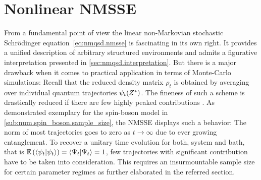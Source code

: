 \section{Nonlinear NMSSE}
\label{sec:nmqsd.nonlin_nmsse}
%

From a fundamental point of view the linear non-Markovian stochastic Schrödinger equation~\ref{eq:nmqsd.nmsse} is fascinating in its own right.
It provides a unified description of arbitrary structured environments and admits a figurative interpretation presented in \autoref{sec:nmqsd.interpretation}.
But there is a major drawback when it comes to practical application in terms of Monte-Carlo simulations:
Recall that the reduced density matrix $\rho_t$ is obtained by averaging over individual quantum trajectories $\psi_t({Z}^*)$.
The fineness of such a scheme is drastically reduced if there are few highly peaked contributions \cite{DuSh11_monte_carlo}.
As demonstrated exemplary for the spin-boson model in \autoref{sub:num.spin_boson.sample_size}, the NMSSE displays such a behavior:
The norm of most trajectories goes to zero as $t \to \infty$ due to ever growing entanglement.
To recover a unitary time evolution for both, system and bath, that is $\E[\braket{\psi_t}{\psi_t}] = \braket{\Psi_t}{\Psi_t} = 1$, few trajectories with significant contribution have to be taken into consideration.
This requires an insurmountable sample size for certain parameter regimes as further elaborated in the referred section.\\

